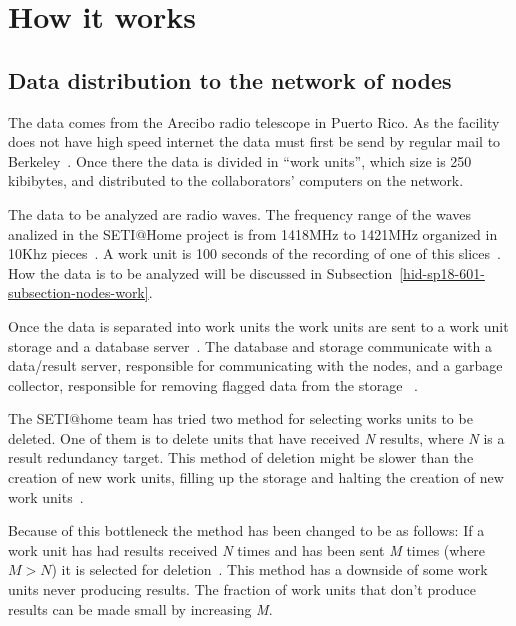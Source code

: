 \section{How it works}\label{hid-sp18-601-section-howworks}
\subsection{Data distribution to the network of nodes}\label{hid-sp18-601-subsection-data-dist}
The data comes from the Arecibo radio telescope in Puerto Rico. As the facility
does not have high speed internet the data must first be send by regular mail to
 Berkeley~\cite{hid-sp18-601-www-sathome-howworks}. Once there the data is 
 divided in ``work units'', which size is 250 kibibytes, and distributed to the 
 collaborators' computers on the network.

The data to be analyzed are radio waves. The frequency range of the waves 
analized in the SETI$@$Home project is from 1418MHz to 1421MHz organized in 
10Khz pieces~\cite{hid-sp18-601-paper-anderson2002seti}. A work unit is 100 
seconds of the recording of one of this 
slices~\cite{hid-sp18-601-www-sathome-howworks}. How the data is to be analyzed 
will be discussed in Subsection~\ref{hid-sp18-601-subsection-nodes-work}.

Once the data is separated into work units the work units are sent to a work 
unit storage and a database server~\cite{hid-sp18-601-book-foster1999carl}. 
The database and storage communicate with a data/result server, responsible for 
communicating with the nodes, and a garbage collector, responsible for 
removing flagged data from the 
storage
~\cite{hid-sp18-601-book-foster1999carl,hid-sp18-601-paper-anderson2002seti}.

The SETI$@$home team has tried two method for selecting works units to be 
deleted. One of them is to delete units that have received \textit{N} results,
where \textit{N} is a result redundancy target. This method of deletion might 
be slower than the creation of new work units, filling up the storage and 
halting the creation of new work 
units~\cite{hid-sp18-601-paper-anderson2002seti}.

Because of this bottleneck the method has been changed to be as follows: 
If a work unit has had results received \textit{N} times and has been sent 
\textit{M} times (where $M>N$) it is selected for 
deletion~\cite{hid-sp18-601-paper-anderson2002seti}. This method has 
a downside of some work units never producing results. The fraction of work
units that don't produce results can be made small by increasing \textit{M}.

